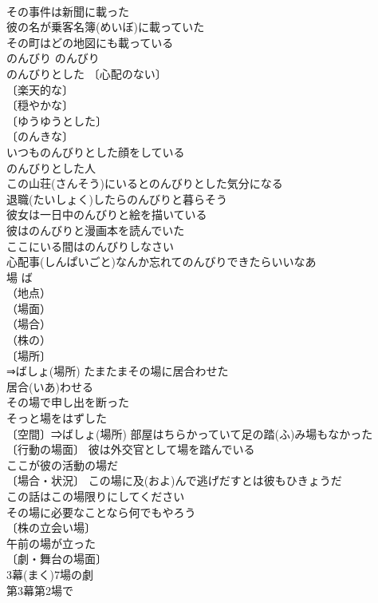 \documentclass[8pt]{extreport}
\begin{document}
\begin{CJK}{UTF8}{min}
\\	その事件は新聞に載った 
\\	彼の名が乗客名簿(めいぼ)に載っていた 
\\	その町はどの地図にも載っている 
\\	のんびり	のんびり	
\\	のんびりとした 〔心配のない〕
\\	〔楽天的な〕
\\	〔穏やかな〕
\\	〔ゆうゆうとした〕
\\	〔のんきな〕
\\	いつものんびりとした顔をしている 
\\	のんびりとした人 
\\	この山荘(さんそう)にいるとのんびりとした気分になる 
\\	退職(たいしょく)したらのんびりと暮らそう 
\\	彼女は一日中のんびりと絵を描いている 
\\	彼はのんびりと漫画本を読んでいた 
\\	ここにいる間はのんびりしなさい 
\\	心配事(しんぱいごと)なんか忘れてのんびりできたらいいなあ 
\\	場	ば	
\\	（地点）
\\	（場面）
\\	（場合）
\\	（株の）
\\	〔場所〕
\\	⇒ばしょ(場所) たまたまその場に居合わせた 
\\	居合(いあ)わせる　
\\	その場で申し出を断った 
\\	そっと場をはずした 
\\	〔空間〕⇒ばしょ(場所) 部屋はちらかっていて足の踏(ふ)み場もなかった 
\\	〔行動の場面〕 彼は外交官として場を踏んでいる 
\\	ここが彼の活動の場だ 
\\	〔場合・状況〕 この場に及(およ)んで逃げだすとは彼もひきょうだ 
\\	この話はこの場限りにしてください 
\\	その場に必要なことなら何でもやろう 
\\	〔株の立会い場〕
\\	午前の場が立った 
\\	〔劇・舞台の場面〕
\\	3幕(まく)7場の劇 
\\	第3幕第2場で 

\end{CJK}
\end{document}
